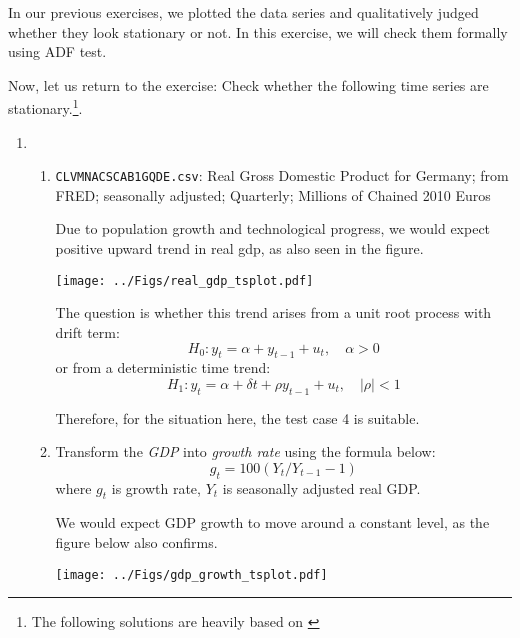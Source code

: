 In our previous exercises, we plotted the data series and qualitatively judged whether they look stationary or not. In this exercise, we will check them formally using ADF test.



Now, let us return to the exercise: Check whether the following time series are stationary.\footnote{The following solutions are heavily based on \cite[][see page 501-504]{Hamilton-1994}}.
\begin{enumerate}[label=--]
    \item \begin{enumerate}[label=(\roman*)]
              \item \verb|CLVMNACSCAB1GQDE.csv|: Real Gross Domestic Product for Germany; from FRED; seasonally adjusted; Quarterly; Millions of Chained 2010 Euros

                    \begin{sol}
                        Due to population growth and technological progress, we would expect positive upward trend in real gdp, as also seen in the figure.

                        \texttt{[image: ../Figs/real\_gdp\_tsplot.pdf]}

                        The question is whether this trend arises from a unit root process with drift term:
                        \[ H_0: y_t = \alpha + y_{t-1} + u_t, \quad \alpha > 0\]
                        or from a deterministic time trend:
                        \[
                            H_1: y_t = \alpha + \delta t + \rho y_{t-1} + u_t,
                            \quad |\rho| < 1
                        \]

                        Therefore, for the situation here, the test case 4 is suitable.
                    \end{sol}

              \item Transform the \emph{GDP} into \emph{growth rate} using the formula below: \[ g_t = 100 (Y_t / Y_{t-1} - 1) \] where $g_t$ is growth rate, $Y_t$ is seasonally adjusted real GDP.

                    \begin{sol}
                        We would expect GDP growth to move around a constant level, as the figure below also confirms.

                        \texttt{[image: ../Figs/gdp\_growth\_tsplot.pdf]}


\end{sol}
\end{enumerate}
\end{enumerate}
